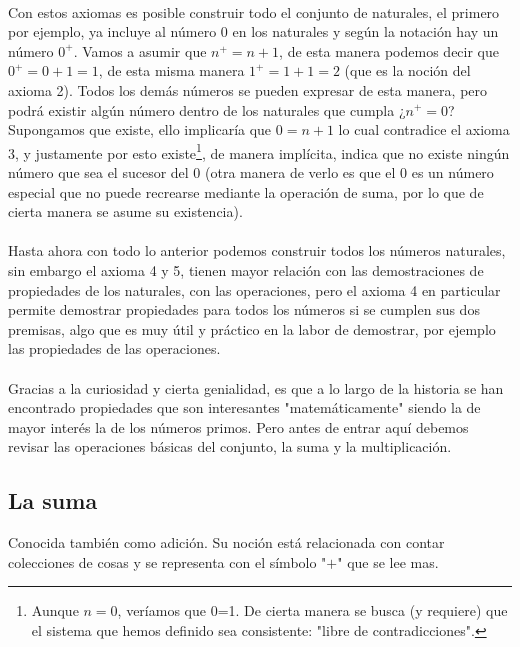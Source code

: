 \documentclass{article}
\begin{document}
\paragraph{} Con estos axiomas es posible construir todo el conjunto de naturales, el primero por ejemplo, ya incluye al número $0$ en los naturales y según la notación hay un número $0^+$. Vamos a asumir que $n^+ = n + 1$,  de esta manera podemos decir que $0^+ = 0 + 1 = 1$, de esta misma manera $1^+ = 1 + 1 = 2$ (que es la noción del axioma 2). Todos los demás números se pueden expresar de esta manera, pero podrá existir algún número dentro de los naturales que cumpla ¿$n^+ = 0$? Supongamos que existe, ello implicaría que $0 = n + 1$ lo cual contradice el axioma 3, y justamente por esto existe\footnote{Aunque $n=0$, veríamos que 0=1. De cierta manera se busca (y requiere) que el sistema que hemos definido sea consistente: "libre de contradicciones".}, de manera implícita, indica que no existe ningún número que sea el sucesor del 0 (otra manera de verlo es que el 0 es un número especial que no puede recrearse mediante la operación de suma, por lo que de cierta manera se asume su existencia).

\paragraph{} Hasta ahora con todo lo anterior podemos construir todos los números naturales, sin embargo el axioma 4 y 5, tienen mayor relación con las demostraciones de propiedades de los naturales, con las operaciones, pero el axioma 4 en particular permite demostrar propiedades para todos los números si se cumplen sus dos premisas, algo que es muy útil y práctico en la labor de demostrar, por ejemplo las propiedades de las operaciones.

\paragraph{} Gracias a la curiosidad y cierta genialidad, es que a lo largo de la historia se han encontrado propiedades que son interesantes "matemáticamente" siendo la de mayor interés la de los números primos. Pero antes de entrar aquí debemos revisar las operaciones básicas del conjunto, la suma y la multiplicación.

\subsection{La suma}

Conocida también como adición. Su noción está relacionada con contar colecciones de cosas y se representa con el símbolo "$+$" que se lee mas.
\end{document}
